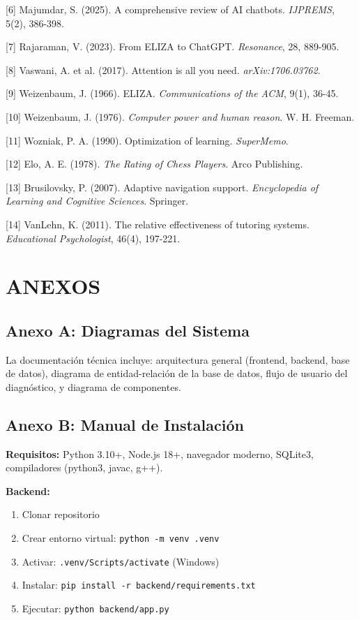 \documentclass[12pt,letterpaper]{article}
\begin{document}
[6] Majumdar, S. (2025). A comprehensive review of AI chatbots. \textit{IJPREMS}, 5(2), 386-398.

[7] Rajaraman, V. (2023). From ELIZA to ChatGPT. \textit{Resonance}, 28, 889-905.

[8] Vaswani, A. et al. (2017). Attention is all you need. \textit{arXiv:1706.03762}.

[9] Weizenbaum, J. (1966). ELIZA. \textit{Communications of the ACM}, 9(1), 36-45.

[10] Weizenbaum, J. (1976). \textit{Computer power and human reason}. W. H. Freeman.

[11] Wozniak, P. A. (1990). Optimization of learning. \textit{SuperMemo}.

[12] Elo, A. E. (1978). \textit{The Rating of Chess Players}. Arco Publishing.

[13] Brusilovsky, P. (2007). Adaptive navigation support. \textit{Encyclopedia of Learning and Cognitive Sciences}. Springer.

[14] VanLehn, K. (2011). The relative effectiveness of tutoring systems. \textit{Educational Psychologist}, 46(4), 197-221.

\newpage
\section{ANEXOS}

\subsection{Anexo A: Diagramas del Sistema}

La documentación técnica incluye: arquitectura general (frontend, backend, base de datos), diagrama de entidad-relación de la base de datos, flujo de usuario del diagnóstico, y diagrama de componentes.

\subsection{Anexo B: Manual de Instalación}

\textbf{Requisitos:} Python 3.10+, Node.js 18+, navegador moderno, SQLite3, compiladores (python3, javac, g++).

\textbf{Backend:}
\begin{enumerate}
\item Clonar repositorio
\item Crear entorno virtual: \texttt{python -m venv .venv}
\item Activar: \texttt{.venv/Scripts/activate} (Windows)
\item Instalar: \texttt{pip install -r backend/requirements.txt}
\item Ejecutar: \texttt{python backend/app.py}
\end{enumerate}
\end{document}
